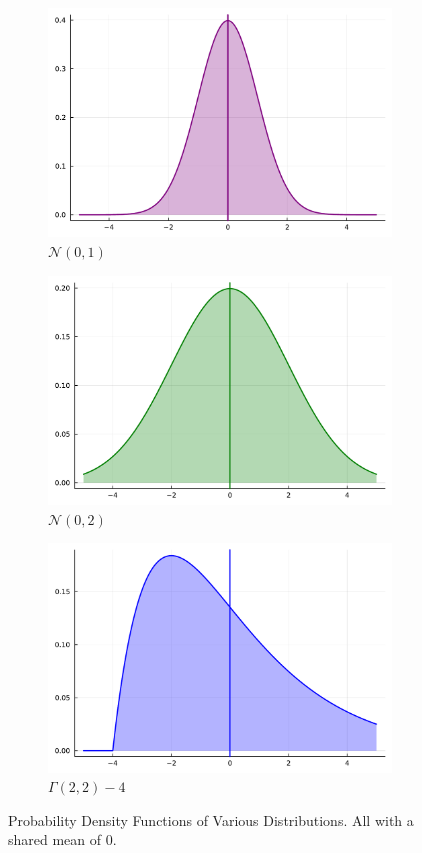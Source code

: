 \documentclass[10pt]{article}
\theoremstyle{plain}
\theoremstyle{remark}
\begin{document}
\begin{figure}[ht!]\label{fig:pdfs}
        \begin{subfigure}[t]{0.5\textwidth}\label{fig:normal}
                \centering
                \includegraphics[width=0.7\linewidth]{julia_figures/normal.pdf}
                \caption{$\mathcal{N}(0,1)$}
        \end{subfigure}
        \begin{subfigure}[t]{0.5\textwidth}\label{fig:normal_wide}
                \centering
                \includegraphics[width=0.7\linewidth]{julia_figures/normal_wide.pdf}
                \caption{$\mathcal{N}(0,2)$}
        \end{subfigure}
        \begin{subfigure}[t]{1.0\textwidth}\label{fig:gamma}
                \centering
                \includegraphics[width=0.4\linewidth]{julia_figures/gamma.pdf}

                \caption{$\Gamma(2,2) - 4$}
        \end{subfigure}
        \caption{Probability Density Functions of Various Distributions. All with a shared mean of 0.}
\end{figure}
\end{document}
